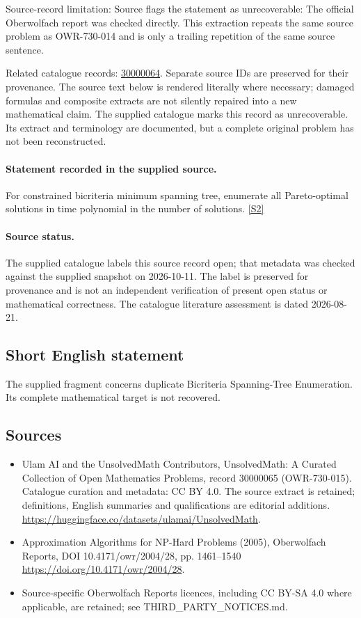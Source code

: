 \documentclass[11pt]{article}
\begin{document}
Source-record limitation: Source flags the statement as unrecoverable: The official Oberwolfach report was checked directly. This extraction repeats the same source problem as OWR-730-014 and is only a trailing repetition of the same source sentence.

Related catalogue records: \href{https://mehmetmars7.github.io/Erdosproblems-llm-hunter/problem.html?type=open_problems&id=30000064}{30000064}. Separate source IDs are preserved for their provenance.
The source text below is rendered literally where necessary; damaged formulas and composite extracts are not silently repaired into a new mathematical claim.
The supplied catalogue marks this record as unrecoverable. Its extract and terminology are documented, but a complete original problem has not been reconstructed.
\paragraph{Statement recorded in the supplied source.}
For constrained bicriteria minimum spanning tree, enumerate all Pareto-optimal solutions in time polynomial in the number of solutions. \href{https://doi.org/10.4171/owr/2004/28}{[S2]}
\paragraph{Source status.}
The supplied catalogue labels this source record open; that metadata was checked against the supplied snapshot on 2026-10-11. The label is preserved for provenance and is not an independent verification of present open status or mathematical correctness. The catalogue literature assessment is dated 2026-08-21.
\subsection{Short English statement}
The supplied fragment concerns duplicate Bicriteria Spanning-Tree Enumeration. Its complete mathematical target is not recovered.
\subsection{Sources}
\begin{itemize}
\item[S1] Ulam AI and the UnsolvedMath Contributors, UnsolvedMath: A Curated Collection of Open Mathematics Problems, record 30000065 (OWR-730-015). Catalogue curation and metadata: CC BY 4.0. The source extract is retained; definitions, English summaries and qualifications are editorial additions.
\url{https://huggingface.co/datasets/ulamai/UnsolvedMath}.
\item[S2] Approximation Algorithms for NP-Hard Problems (2005), Oberwolfach Reports, DOI 10.4171/owr/2004/28, pp. 1461--1540
\url{https://doi.org/10.4171/owr/2004/28}.
\item Source-specific Oberwolfach Reports licences, including CC BY-SA 4.0 where applicable, are retained; see THIRD\_PARTY\_NOTICES.md.
\end{itemize}
\end{document}

